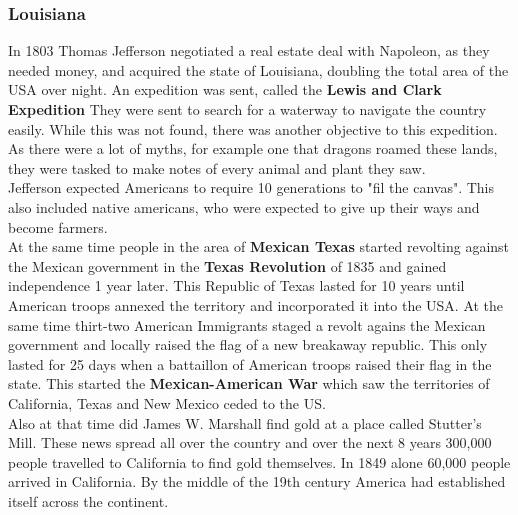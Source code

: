 \documentclass{article}
\begin{document}
	\subsubsection{Louisiana}
	In 1803 Thomas Jefferson negotiated a real estate deal with Napoleon, as they needed money, and acquired the state of Louisiana, doubling the total area of the USA over night. An expedition was sent, called the \textbf{Lewis and Clark Expedition} They were sent to search for a waterway to navigate the country easily. While this was not found, there was another objective to this expedition. As there were a lot of myths, for example one that dragons roamed these lands, they were tasked to make notes of every animal and plant they saw. \\
	Jefferson expected Americans to require 10 generations to "fil the canvas". This also included native americans, who were expected to give up their ways and become farmers. \\
	At the same time people in the area of \textbf{Mexican Texas} started revolting against the Mexican government in the \textbf{Texas Revolution} of 1835 and gained independence 1 year later. This Republic of Texas lasted for 10 years until American troops annexed the territory and incorporated it into the USA. At the same time thirt-two American Immigrants staged a revolt agains the Mexican government and locally raised the flag of a new breakaway republic. This only lasted for 25 days when a battaillon of American troops raised their flag in the state. This started the \textbf{Mexican-American War} which saw the territories of California, Texas and New Mexico ceded to the US. \\
	Also at that time did James W. Marshall find gold at a place called Stutter's Mill. These news spread all over the country and over the next 8 years 300,000 people travelled to California to find gold themselves. In 1849 alone 60,000 people arrived in California.
	By the middle of the 19th century America had established itself across the continent.
\end{document}
